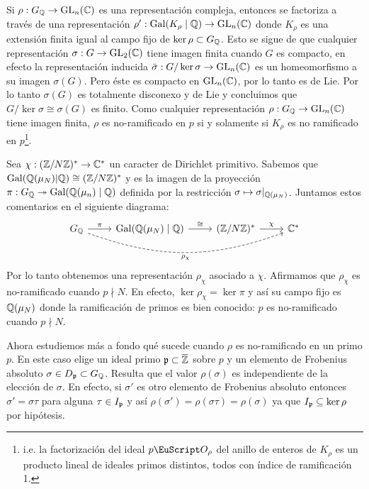 \documentclass[../../tesis_maestria]{subfiles}
\begin{document}
\begin{nota}
  Si $\rho:G_{\mathbb{Q}}\rightarrow\mathrm{GL}_n(\mathbb{C})$ es una representaci\'on compleja, entonces se factoriza a trav\'es de una representaci\'on $\rho':\mathrm{Gal}(K_{\rho}\mid\mathbb{Q})\rightarrow\mathrm{GL}_n(\mathbb{C})$ donde $K_{\rho}$ es una extensi\'on finita igual al campo fijo de $\ker\rho\subset G_{\mathbb{Q}}$. Esto se sigue de que cualquier representaci\'on $\sigma:G\rightarrow \mathrm{GL}_2(\mathbb{C})$ tiene imagen finita cuando $G$ es compacto, en efecto la representaci\'on inducida $\bar{\sigma}:G/\ker\sigma\rightarrow\mathrm{GL}_n(\mathbb{C})$ es un homeomorfismo a su imagen $\sigma(G)$. Pero \'este es compacto en $\mathrm{GL}_n(\mathbb{C})$, por lo tanto es de Lie. Por lo tanto $\sigma(G)$ es totalmente disconexo y de Lie y concluimos que $G/\ker\sigma\cong\sigma(G)$ es finito. Como cualquier representaci\'on $\rho:G_{\mathbb{Q}}\rightarrow\mathrm{GL}_n(\mathbb{C})$ tiene imagen finita, $\rho$ es no-ramificado en $p$ si y solamente si  $K_{\rho}$ es no ramificado en $p$\footnote[2]{i.e. la factorizaci\'on del ideal $p\Oo_{\rho}$ del anillo de enteros de $K_{\rho}$ es un producto lineal de ideales primos distintos, todos con \'indice de ramificaci\'on 1.}.
\end{nota}

\begin{ejemplo}\label{ej:car_ciclo_modN}
  Sea $\chi:(\mathbb{Z}/N\mathbb{Z})^*\rightarrow\mathbb{C}^*$ un caracter de Dirichlet primitivo. Sabemos que $\mathrm{Gal}(\mathbb{Q}(\mu_N)|\mathbb{Q})\cong(\mathbb{Z}/N\mathbb{Z})^*$ y es la imagen de la proyecci\'on $\pi:G_{\mathbb{Q}}\twoheadrightarrow\mathrm{Gal}(\mathbb{Q}(\mu_n)\mid\mathbb{Q})$ definida por la restricci\'on $\sigma\mapsto\sigma|_{\mathbb{Q}(\mu_N)}$. Juntamos estos comentarios en el siguiente diagrama:
  \[
    \begin{tikzcd}
      \GQ \arrow[r,"\pi"] \arrow[rrr,dashed,bend right=20,"\rho_{\chi}"']&
      \Gal(\QQ(\mu_N)\mid\QQ) \arrow[r,"\cong"] &
      (\ZZ/N\ZZ)^* \arrow[r,"\chi"] &
      \CC^*
    \end{tikzcd}
  \]
  Por lo tanto obtenemos una representaci\'on $\rho_{\chi}$ asociado a $\chi$. Afirmamos que $\rho_{\chi}$ es no-ramificado cuando $p\nmid N$. En efecto, $\ker\rho_{\chi}=\ker\pi$ y as\'i su campo fijo es $\mathbb{Q}(\mu_N)$ donde la ramificaci\'on de primos es bien  conocido: $p$ es no-ramificado cuando $p\nmid N$.
\end{ejemplo}

Ahora estudiemos m\'as a fondo qu\'e sucede cuando $\rho$ es no-ramificado en un primo $p$. En este caso elige un ideal primo $\mathfrak{p}\subset\overline{\mathbb{Z}}$
sobre $p$ y un elemento de Frobenius absoluto $\sigma\in D_{\mathfrak{p}}\subset G_{\mathbb{Q}}$. Resulta que el valor $\rho(\sigma)$ es independiente de la elecci\'on de $\sigma$. En efecto, si $\sigma'$ es otro elemento de Frobenius absoluto entonces $\sigma'=\sigma\tau$ para alguna $\tau\in I_{\mathfrak{p}}$ y as\'i $\rho(\sigma')=\rho(\sigma\tau)=\rho(\sigma)$ ya que $I_{\mathfrak{p}}\subseteq\ker\rho$ por hip\'otesis.
\end{document}
